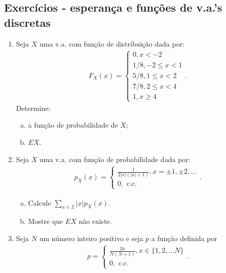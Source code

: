 \documentclass[../Notas.tex]{subfiles}
\begin{document}
\subsection{Exercícios - esperança e funções de v.a.'s discretas}

\begin{enumerate}
    \item Seja $X$ uma v.a. com função de distribuição dada por:
    \begin{align*}
        F_X(x) = \begin{cases}
            0, x < -2 \\
            1/8, -2\leq x < 1 \\
            5/8, 1\leq x < 2 \\
            7/8, 2\leq x < 4 \\
            1, x\geq 4
        \end{cases}.
    \end{align*}
    Determine:
    \begin{enumerate}[a)]
        \item a função de probabilidade de $X$;
        \item $EX$.
    \end{enumerate}
    \item Seja $X$ uma v.a. com função de probabilidade dada por:
    \begin{align*}
        p_X(x) = \begin{cases}
        \frac{1}{2|x|(|x|+1)}, x = \pm 1, \pm 2, \dots \\
        0, \text{ c.c.}
        \end{cases}.
    \end{align*}
    \begin{enumerate}[a)]
        \item Calcule $\displaystyle{ \sum_{x\in\mathbb{Z}} |x|p_X(x) }$.
        \item Mostre que $EX$ não existe.
    \end{enumerate}
    \item Seja $N$ um número inteiro positivo e seja $p$ a função definida por
    \begin{align*}
        p = \begin{cases}
            \frac{2x}{N(N+1)}, x\in\{1, 2, \dots N\} \\
            0, \text{ c.c.}
        \end{cases}.
    \end{align*}
    \begin{enumerate}[a)]

\end{enumerate}
\end{enumerate}
\end{document}
